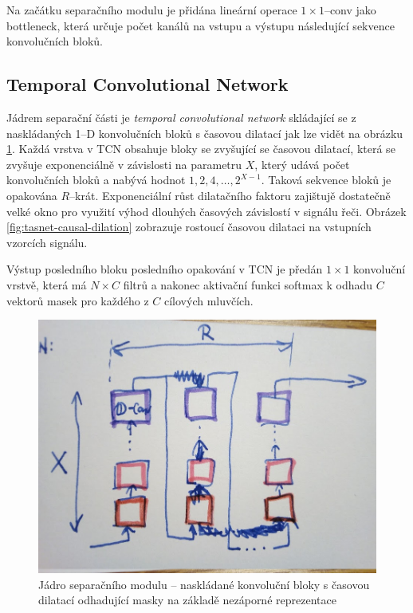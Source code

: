 
Na začátku separačního modulu je přidána lineární operace $1 \times 1$--conv jako bottleneck, která určuje počet kanálů na vstupu a výstupu následující sekvence konvolučních bloků. 

\subsection{Temporal Convolutional Network}
Jádrem separační části je \textit{temporal convolutional network} skládající se z naskládaných  1--D konvolučních bloků s časovou dilatací jak lze vidět na obrázku \ref{fig:tasnet-stacked-resblocks}. Každá vrstva v TCN obsahuje bloky se zvyšující se časovou dilatací, která se zvyšuje exponenciálně v závislosti na parametru $X$, který udává počet konvolučních bloků  a nabývá hodnot $1, 2, 4, \dots, 2^{X-1}$. Taková sekvence bloků je opakována $R$--krát. Exponenciální růst dilatačního faktoru zajištujě dostatečně velké okno pro využití výhod dlouhých časových závislostí v signálu řeči. Obrázek \ref{fig:tasnet-causal-dilation} zobrazuje rostoucí časovou dilataci na vstupních vzorcích signálu.

Výstup posledního bloku posledního opakování v TCN je předán $1 \times 1$ konvoluční vrstvě, která má $N \times C$ filtrů a nakonec aktivační funkci softmax k odhadu $C$ vektorů masek pro každého z $C$ cílových mluvčích.


\begin{figure}[H]
    \centering
    \includegraphics[scale=0.35]{obrazky-figures/stacked_resblocks.jpg}
    \caption{\label{fig:tasnet-stacked-resblocks}Jádro separačního modulu -- naskládané konvoluční bloky s časovou dilatací odhadující masky na základě nezáporné reprezentace}
\end{figure}

